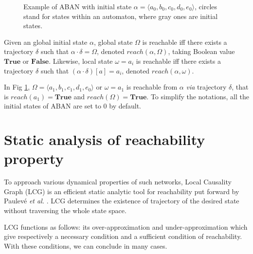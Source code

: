 \documentclass[runningheads]{llncs}
\begin{document}
\begin{figure}[ht]
\centering

\caption{Example of ABAN with initial state $\alpha=\langle a_0,b_0,c_0,d_0,e_0\rangle$, circles stand for states within an automaton, where gray ones are initial states.}\label{fig:1}
\end{figure}	

\begin{definition}[Reachability]
Given an global initial state $\alpha$, global state $\Omega$ is reachable iff there exists a trajectory $\delta$ such that $\alpha\cdot \delta=\Omega$, denoted $reach(\alpha, \Omega)$, taking Boolean value $\mathbf{True}$ or $\mathbf{False}$.
Likewise, local state $\omega=a_i$ is reachable iff there exists a trajectory $\delta$ such that $(\alpha\cdot \delta)[a]=a_i$, denoted $reach(\alpha, \omega)$.
\end{definition}

In Fig \ref{fig:1}, $\Omega=\langle a_1,b_1,c_1,d_1,e_0\rangle$ or $\omega=a_1$ is reachable from $\alpha$ \textit{via} trajectory $\delta$, that is $reach(a_1)=\mathbf{True}$ and $reach(\Omega)=\mathbf{True}$.
To simplify the notations, all the initial states of ABAN are set to 0 by default.
\section{Static analysis of reachability property}\label{sect:3}
To approach various dynamical properties of such networks, Local Causality Graph (LCG) is an efficient static analytic tool for reachability put forward by Paulev\'e \textit{et al.} \cite{pauleve2011}. 
LCG determines the existence of trajectory of the desired state without traversing the whole state space.

LCG functions as follows: its over-approximation and under-approximation which give respectively a necessary condition and a sufficient condition of reachability. 
With these conditions, we can conclude in many cases.%

\end{document}
